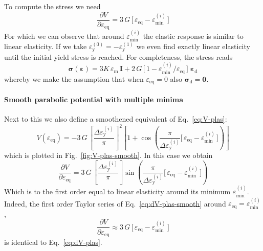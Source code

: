 \documentclass[times,namecite]{goose-article}
\begin{document}
To compute the stress we need
\begin{equation}\label{eq:dV-plas}
  \frac{\partial V}{\partial \varepsilon_\mathrm{eq}}
  =
  3 \, G \, \Big[\, \varepsilon_\mathrm{eq} - \varepsilon_\mathrm{min}^{(i)} \,\Big]
\end{equation}
For which we can observe that around $\varepsilon_\mathrm{min}^{(i)}$ the elastic response is similar to linear elasticity. If we take $\varepsilon_\mathrm{y}^{(0)} = - \varepsilon_\mathrm{y}^{(1)}$ we even find exactly linear elasticity until the initial yield stress is reached. For completeness, the stress reads
\begin{equation}
  \bm{\sigma} ( \bm{\varepsilon} )
  =
  3 K \, \varepsilon_\mathrm{m} \, \bm{I}
  +
  2 \, G \, \Big[\, 1 - \varepsilon_\mathrm{min}^{(i)} / \varepsilon_\mathrm{eq} \,\Big] \;
  \bm{\varepsilon}_\mathrm{d}
\end{equation}
whereby we make the assumption that when $\varepsilon_\mathrm{eq} = 0$ also $\bm{\sigma}_\mathrm{d} = \bm{0}$.

\paragraph{Smooth parabolic potential with multiple minima}

Next to this we also define a smoothened equivalent of Eq.~\eqref{eq:V-plas}:
\begin{equation}\label{eq:V-plas-smooth}
  V ( \varepsilon_\mathrm{eq} )
  =
  - 3 \, G \,
  \left[ \frac{\Delta \varepsilon_\mathrm{y}^{(i)}}{\pi} \right]^2
  \left[
    1
    +
    \cos \left(
      \frac{ \pi }{ \Delta \varepsilon_\mathrm{y}^{(i)} }
      \Big[\, \varepsilon_\mathrm{eq} - \varepsilon_\mathrm{min}^{(i)} \,\Big]
    \right)
  \right]
\end{equation}
which is plotted in Fig.~\ref{fig:V-plas-smooth}. In this case we obtain
\begin{equation}\label{eq:dV-plas-smooth}
  \frac{\partial V}{\partial \varepsilon_\mathrm{eq}}
  =
  3 \, G \,
  \left[ \frac{\Delta \varepsilon_\mathrm{y}^{(i)}}{\pi} \right]
  \sin \left(
    \frac{ \pi }{ \Delta \varepsilon_\mathrm{y}^{(i)} }
    \Big[\, \varepsilon_\mathrm{eq} - \varepsilon_\mathrm{min}^{(i)} \,\Big]
  \right)
\end{equation}
Which is to the first order equal to linear elasticity around its minimum $\varepsilon_\mathrm{min}^{(i)}$. Indeed, the first order Taylor series of Eq.~\eqref{eq:dV-plas-smooth} around $\varepsilon_\mathrm{eq} = \varepsilon_\mathrm{min}^{(i)}$,
\begin{equation}
  \frac{\partial V}{\partial \varepsilon_\mathrm{eq}}
  \approx
  3 \, G \, \Big[\, \varepsilon_\mathrm{eq} - \varepsilon_\mathrm{min}^{(i)} \,\Big]
\end{equation}
is identical to Eq.~\eqref{eq:dV-plas}.
\end{document}
